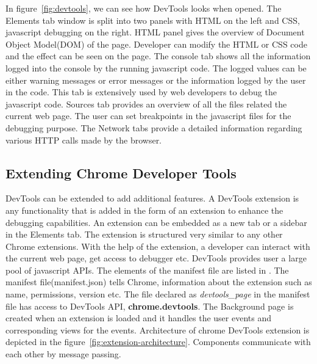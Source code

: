 In figure~\ref{fig:devtools}, we can see how DevTools looks when opened. The Elements tab window is split into two panels with HTML on the left and CSS, javascript debugging on the right. HTML panel gives the overview of Document Object Model(DOM) of the page. Developer can modify the HTML or CSS code and the effect can be seen on the page. The console tab shows all the information logged into the console by the running javascript code. The logged values can be either warning messages or error messages or the information logged by the user in the code. This tab is extensively used by web developers to debug the javascript code. Sources tab provides an overview of all the files related the current web page. The user can set breakpoints in the javascript files for the debugging purpose. The Network tabs provide a detailed information regarding various HTTP calls made by the browser. 

\subsection{Extending Chrome Developer Tools} \label{section:extending_devtools}
DevTools can be extended to add additional features. 
A DevTools extension is any functionality that is added in the form of an extension to enhance the debugging capabilities. 
An extension can be embedded as a new tab or a sidebar in the Elements tab. 
The extension is structured very similar to any other Chrome extensions\cite{devtoolsextension}. 
With the help of the extension, a developer can interact with the current web page, get access to debugger etc. 
DevTools provides user a large pool of javascript APIs\cite{devtools}. 
The elements of the manifest file are listed in \cite{devtoolsmanifestfile}. 
The manifest file(manifest.json) tells Chrome, information about the extension such as name, permissions, version etc. 
The file declared as \textit{devtools\_page} in the manifest file has access to DevTools API, \textbf{chrome.devtools}. 
The Background page is created when an extension is loaded and it handles the user events and corresponding views for the events. 
Architecture of chrome DevTools extension is depicted in the figure~\ref{fig:extension-architecture}. 
Components communicate with each other by message passing.

